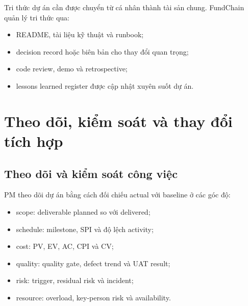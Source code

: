 Tri thức dự án cần được chuyển từ cá nhân thành tài sản chung. FundChain quản lý tri thức qua:

\begin{itemize}
  \item README, tài liệu kỹ thuật và runbook;
  \item decision record hoặc biên bản cho thay đổi quan trọng;
  \item code review, demo và retrospective;
  \item lessons learned register được cập nhật xuyên suốt dự án.
\end{itemize}

\fi
\section{Theo dõi, kiểm soát và thay đổi tích hợp}

\subsection{Theo dõi và kiểm soát công việc}

PM theo dõi dự án bằng cách đối chiếu actual với baseline ở các góc độ:

\begin{itemize}
  \item scope: deliverable planned so với delivered;
  \item schedule: milestone, SPI và độ lệch activity;
  \item cost: PV, EV, AC, CPI và CV;
  \item quality: quality gate, defect trend và UAT result;
  \item risk: trigger, residual risk và incident;
  \item resource: overload, key-person risk và availability.
\end{itemize}

